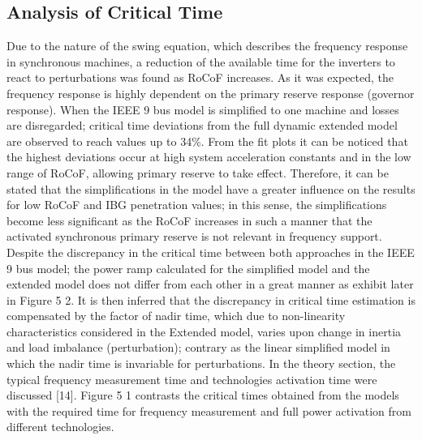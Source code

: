
\subsection{Analysis of Critical Time} 

Due to the nature of the swing equation, which describes the frequency response in synchronous machines, a reduction of the available time for the inverters to react to perturbations was found as RoCoF increases.
As it was expected, the frequency response is highly dependent on the primary reserve response (governor response). When the IEEE 9 bus model is simplified to one machine and losses are disregarded; critical time deviations from the full dynamic extended model are observed to reach values up to 34\%. From the fit plots it can be noticed that the highest deviations occur at high system acceleration constants and in the low range of RoCoF, allowing primary reserve to take effect. Therefore, it can be stated that the simplifications in the model have a greater influence on the results for low RoCoF and IBG penetration values; in this sense, the simplifications become less significant as the RoCoF increases in such a manner that the activated synchronous primary reserve is not relevant in frequency support.
Despite the discrepancy in the critical time between both approaches in the IEEE 9 bus model; the power ramp calculated for the simplified model and the extended model does not differ from each other in a great manner as exhibit later in Figure 5 2. It is then inferred that the discrepancy in critical time estimation is compensated by the factor of nadir time, which due to non-linearity characteristics considered in the Extended model, varies upon change in inertia and load imbalance (perturbation); contrary as the linear simplified model in which the nadir time is invariable for perturbations.
In the theory section, the typical frequency measurement time and technologies activation time were discussed [14]. Figure 5 1 contrasts the critical times obtained from the models with the required time for frequency measurement and full power activation from different technologies.


